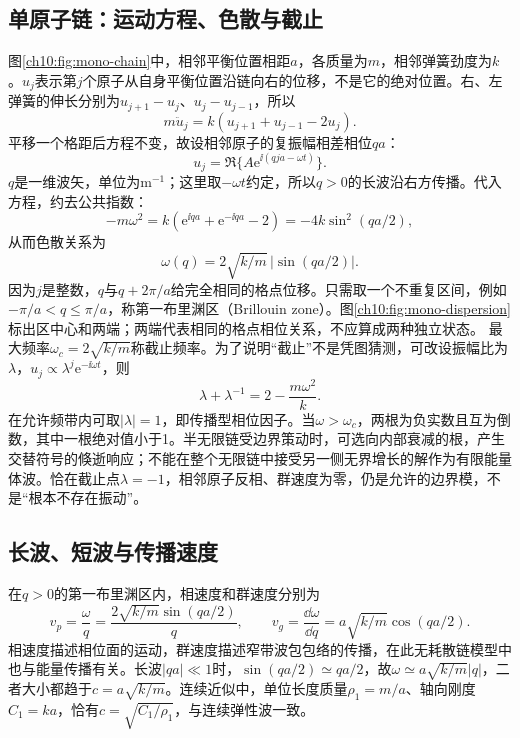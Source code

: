 \subsection{单原子链：运动方程、色散与截止}
图\ref{ch10:fig:mono-chain}中，相邻平衡位置相距$a$，各质量为$m$，相邻弹簧劲度为$k$。$u_j$表示第$j$个原子从自身平衡位置沿链向右的位移，不是它的绝对位置。右、左弹簧的伸长分别为$u_{j+1}-u_j$、$u_j-u_{j-1}$，所以
\begin{equation}\label{ch10:eq:mono-motion}
 m\ddot u_j=k(u_{j+1}+u_{j-1}-2u_j).
\end{equation}
\chTenMonoChainFigure
平移一个格距后方程不变，故设相邻原子的复振幅相差相位$qa$：
\[
 u_j=\Re\{A\mathrm e^{\ii(qja-\omega t)}\}.
\]
$q$是一维波矢，单位为$\mathrm{m^{-1}}$；这里取$-\omega t$约定，所以$q>0$的长波沿右方传播。代入方程，约去公共指数：
\[
 -m\omega^2=k(\mathrm e^{\ii qa}+\mathrm e^{-\ii qa}-2)
 =-4k\sin^2(qa/2),
\]
从而色散关系为
\begin{equation}\label{ch10:eq:mono-dispersion}
 \omega(q)=2\sqrt{k/m}\,|\sin(qa/2)|.
\end{equation}
因为$j$是整数，$q$与$q+2\pi/a$给完全相同的格点位移。只需取一个不重复区间，例如$-\pi/a<q\leq\pi/a$，称第一布里渊区（Brillouin zone）。图\ref{ch10:fig:mono-dispersion}标出区中心和两端；两端代表相同的格点相位关系，不应算成两种独立状态。
\chTenMonoDispersionFigure
最大频率$\omega_c=2\sqrt{k/m}$称截止频率。为了说明“截止”不是凭图猜测，可改设振幅比为$\lambda$，$u_j\propto\lambda^j\mathrm e^{-\ii\omega t}$，则
\[
 \lambda+\lambda^{-1}=2-\frac{m\omega^2}{k}.
\]
在允许频带内可取$|\lambda|=1$，即传播型相位因子。当$\omega>\omega_c$，两根为负实数且互为倒数，其中一根绝对值小于1。半无限链受边界策动时，可选向内部衰减的根，产生交替符号的倏逝响应；不能在整个无限链中接受另一侧无界增长的解作为有限能量体波。恰在截止点$\lambda=-1$，相邻原子反相、群速度为零，仍是允许的边界模，不是“根本不存在振动”。

\subsection{长波、短波与传播速度}
在$q>0$的第一布里渊区内，相速度和群速度分别为
\[
 v_p=\frac\omega q=\frac{2\sqrt{k/m}\sin(qa/2)}q,
 \qquad v_g=\frac{\dd\omega}{\dd q}=a\sqrt{k/m}\cos(qa/2).
\]
相速度描述相位面的运动，群速度描述窄带波包包络的传播，在此无耗散链模型中也与能量传播有关。长波$|qa|\ll1$时，$\sin(qa/2)\simeq qa/2$，故$\omega\simeq a\sqrt{k/m}|q|$，二者大小都趋于$c=a\sqrt{k/m}$。连续近似中，单位长度质量$\rho_1=m/a$、轴向刚度$C_1=ka$，恰有$c=\sqrt{C_1/\rho_1}$，与连续弹性波一致。

